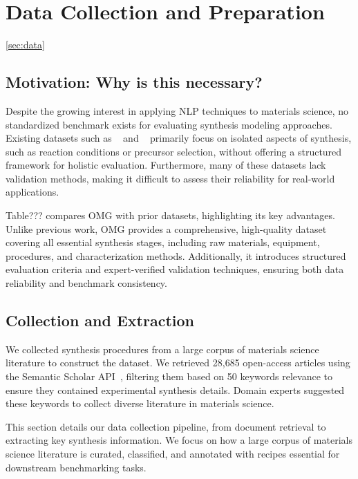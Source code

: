 
\section{Data Collection and Preparation}
\label{sec:data_collection}
\ref{sec:data}

\subsection{Motivation: Why is this necessary?}
Despite the growing interest in applying NLP techniques to materials science, no standardized benchmark exists for evaluating synthesis modeling approaches. Existing datasets such as ~\cite{wang2022dataset} and ~\cite{kononova2019text} primarily focus on isolated aspects of synthesis, such as reaction conditions or precursor selection, without offering a structured framework for holistic evaluation. Furthermore, many of these datasets lack validation methods, making it difficult to assess their reliability for real-world applications.

Table???
compares OMG with prior datasets, highlighting its key advantages. Unlike previous work, OMG provides a comprehensive, high-quality dataset covering all essential synthesis stages, including raw materials, equipment, procedures, and characterization methods. Additionally, it introduces structured evaluation criteria and expert-verified validation techniques, ensuring both data reliability and benchmark consistency.


\subsection{Collection and Extraction}
We collected synthesis procedures from a large corpus of materials science literature to construct the dataset. We retrieved 28,685 open-access articles using the Semantic Scholar API~\cite{semanticscholar2023}, filtering them based on 50 keywords relevance to ensure they contained experimental synthesis details. Domain experts suggested these keywords to collect diverse literature in materials science.

This section details our data collection pipeline, from document retrieval to extracting key synthesis information. We focus on how a large corpus of materials science literature is curated, classified, and annotated with recipes essential for downstream benchmarking tasks.

